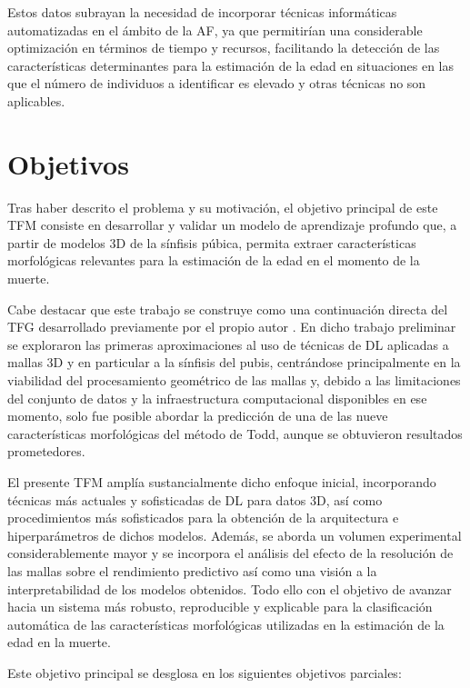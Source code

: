 Estos datos subrayan la necesidad de incorporar técnicas informáticas automatizadas en el ámbito de la AF, ya que permitirían una considerable optimización en términos de tiempo y recursos, facilitando la detección de las características determinantes para la estimación de la edad en situaciones en las que el número de individuos a identificar es elevado y otras técnicas no son aplicables.

\section{Objetivos}

Tras haber descrito el problema y su motivación, el objetivo principal de este TFM consiste en desarrollar y validar un modelo de aprendizaje profundo que, a partir de modelos 3D de la sínfisis púbica, permita extraer características morfológicas relevantes para la estimación de la edad en el momento de la muerte.

Cabe destacar que este trabajo se construye como una continuación directa del TFG desarrollado previamente por el propio autor \cite{lugli_tfg_2022}. En dicho trabajo preliminar se exploraron las primeras aproximaciones al uso de técnicas de DL aplicadas a mallas 3D y en particular a la sínfisis del pubis, centrándose principalmente en la viabilidad del procesamiento geométrico de las mallas y, debido a las limitaciones del conjunto de datos y la infraestructura computacional disponibles en ese momento, solo fue posible abordar la predicción de una de las nueve características morfológicas del método de Todd, aunque se obtuvieron resultados prometedores.

El presente TFM amplía sustancialmente dicho enfoque inicial, incorporando técnicas más actuales y sofisticadas de DL para datos 3D, así como procedimientos más sofisticados para la obtención de la arquitectura e hiperparámetros de dichos modelos. Además, se aborda un volumen experimental considerablemente mayor y se incorpora el análisis del efecto de la resolución de las mallas sobre el rendimiento predictivo así como una visión a la interpretabilidad de los modelos obtenidos. Todo ello con el objetivo de avanzar hacia un sistema más robusto, reproducible y explicable para la clasificación automática de las características morfológicas utilizadas en la estimación de la edad en la muerte.

Este objetivo principal se desglosa en los siguientes objetivos parciales:


